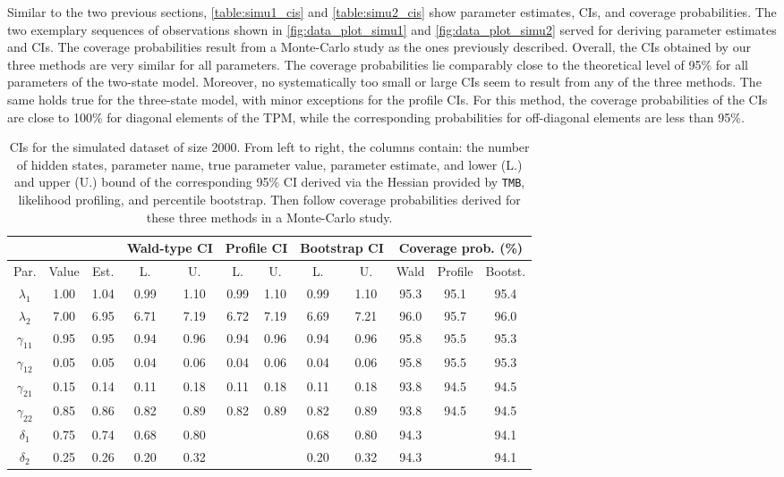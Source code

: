 \documentclass[bimj,fleqn]{w-art}\usepackage[]{graphicx}\usepackage[]{color}
\theoremstyle{plain}
\theoremstyle{definition}
\begin{document}
Similar to the two previous sections, \autoref{table:simu1_cis} and \autoref{table:simu2_cis} show parameter estimates, CIs, and coverage probabilities. The two exemplary sequences of observations shown in \autoref{fig:data_plot_simu1} and \autoref{fig:data_plot_simu2} served for deriving parameter estimates and CIs. The coverage probabilities result from a Monte-Carlo study as the ones previously described. Overall, the CIs obtained by our three methods are very similar for all parameters. The coverage probabilities lie comparably close to the theoretical level of 95\% for all parameters of the two-state model. Moreover, no systematically too small or large CIs seem to result from any of the three methods. The same holds true for the three-state model, with minor exceptions for the profile CIs. For this method, the coverage probabilities of the CIs are close to 100\% for diagonal elements of the TPM, while the corresponding probabilities for off-diagonal elements are less than 95\%.

\begin{table}[ht]
\centering
\begin{tabular}{cccccccccccc}
  &&& \multicolumn{2}{c}{Wald-type CI}& \multicolumn{2}{c}{Profile CI}& \multicolumn{2}{c}{Bootstrap CI}& \multicolumn{3}{c}{Coverage prob. (\%)}\\ \hline
Par. & Value & Est. & L. & U. & L. & U. & L. & U. & {Wald} & Profile & Bootst. \\ 
  \hline
$\lambda_{1}$ & 1.00 & 1.04 & 0.99 & 1.10 & 0.99 & 1.10 & 0.99 & 1.10 & 95.3 & 95.1 & 95.4 \\ 
  $\lambda_{2}$ & 7.00 & 6.95 & 6.71 & 7.19 & 6.72 & 7.19 & 6.69 & 7.21 & 96.0 & 95.7 & 96.0 \\ 
  $\gamma_{11}$ & 0.95 & 0.95 & 0.94 & 0.96 & 0.94 & 0.96 & 0.94 & 0.96 & 95.8 & 95.5 & 95.3 \\ 
  $\gamma_{12}$ & 0.05 & 0.05 & 0.04 & 0.06 & 0.04 & 0.06 & 0.04 & 0.06 & 95.8 & 95.5 & 95.3 \\ 
  $\gamma_{21}$ & 0.15 & 0.14 & 0.11 & 0.18 & 0.11 & 0.18 & 0.11 & 0.18 & 93.8 & 94.5 & 94.5 \\ 
  $\gamma_{22}$ & 0.85 & 0.86 & 0.82 & 0.89 & 0.82 & 0.89 & 0.82 & 0.89 & 93.8 & 94.5 & 94.5 \\ 
  $\delta_{1}$ & 0.75 & 0.74 & 0.68 & 0.80 &  &  & 0.68 & 0.80 & 94.3 &  & 94.1 \\ 
  $\delta_{2}$ & 0.25 & 0.26 & 0.20 & 0.32 &  &  & 0.20 & 0.32 & 94.3 &  & 94.1 \\ 
   \hline
\end{tabular}
\caption{CIs for the simulated dataset of size 2000. From left to right, the columns contain: the number of hidden states, parameter name, true parameter value, parameter estimate, and lower (L.) and upper (U.) bound of the corresponding 95\% CI derived via the Hessian provided by {\tt TMB}, likelihood profiling, and percentile bootstrap. Then follow coverage probabilities derived for these three methods in a Monte-Carlo study.} 
\label{table:simu1_cis}
\end{table}
\end{document}
